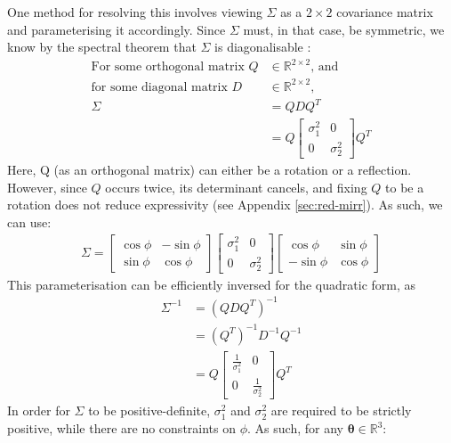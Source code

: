 \documentclass[a4paper, 12pt]{report}
\begin{document}
One method for resolving this involves viewing $\Sigma$ as a $2\times2$ covariance matrix and parameterising it accordingly. Since $\Sigma$ must, in that case, be symmetric, we know by the spectral theorem that $\Sigma$ is diagonalisable \cite{poole2015linear}:
\begin{align}
\textrm{For some orthogonal matrix }Q &\in \mathbb{R}^{2\times 2} \textrm{, and} \nonumber \\
\textrm{for some diagonal matrix }D &\in \mathbb{R}^{2\times 2} \textrm{,}\nonumber \\
\Sigma &= QDQ^T\\
&= Q \begin{bmatrix}
	 \sigma_1^2 & 0\\ 0 &  \sigma_2^2
\end{bmatrix} Q^T
\end{align}
Here, Q (as an orthogonal matrix) can either be a rotation or a reflection. However, since $Q$ occurs twice, its determinant cancels, and fixing $Q$ to be a rotation does not reduce expressivity (see Appendix \ref{sec:red-mirr}). As such, we can use:
\begin{align}
\Sigma = \begin{bmatrix}
	\cos \phi & -\sin \phi \\ \sin\phi & \cos\phi
\end{bmatrix}\begin{bmatrix}
	 \sigma_1^2 & 0\\ 0 &  \sigma_2^2
\end{bmatrix} \begin{bmatrix}
	\cos \phi & \sin \phi \\ -\sin\phi & \cos\phi
\end{bmatrix}
\end{align}
This parameterisation can be efficiently inversed for the quadratic form, as \begin{align}
	\Sigma^{-1} &= (QDQ^T)^{-1}\\
	&= (Q^T)^{-1} D^{-1} Q^{-1}\\
	&= Q\begin{bmatrix}
	 \frac{1}{\sigma_1^2} & 0\\ 0 &  \frac{1}{\sigma_2^2}
\end{bmatrix}Q^T
\end{align}
In order for $\Sigma$ to be positive-definite, $\sigma_1^2$ and $\sigma_2^2$ are required to be strictly positive, while there are no constraints on $\phi$. As such, for any $\boldsymbol{\theta}\in\mathbb{R}^3$:
\end{document}
